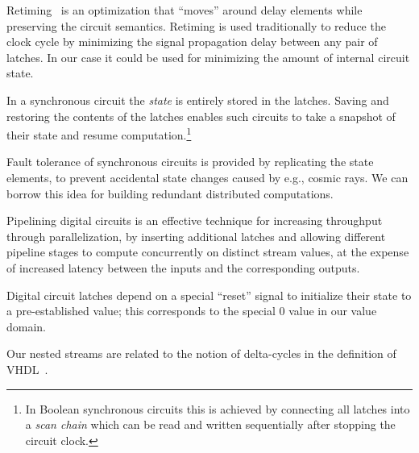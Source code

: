 Retiming~\cite{leiserson-algorithmica91} is an optimization that
``moves'' around delay elements while preserving the circuit
semantics.  Retiming is used traditionally to reduce the clock cycle
by minimizing the signal propagation delay between any pair of
latches.  In our case it could be used for minimizing the amount of
internal circuit state.

In a synchronous circuit the \emph{state} is entirely stored in the
latches.  Saving and restoring the contents of the latches enables
such circuits to take a snapshot of their state and resume
computation.\footnote{In Boolean synchronous circuits this is achieved
  by connecting all latches into a \emph{scan chain} which can be read
  and written sequentially after stopping the circuit clock.}

Fault tolerance of synchronous circuits is provided by replicating the
state elements, to prevent accidental state changes caused by e.g.,
cosmic rays.  We can borrow this idea for building redundant
distributed computations.

Pipelining digital circuits is an effective technique for increasing
throughput through parallelization, by inserting additional latches
and allowing different pipeline stages to compute concurrently on
distinct stream values, at the expense of increased latency between
the inputs and the corresponding outputs.

Digital circuit latches depend on a special ``reset'' signal to
initialize their state to a pre-established value; this corresponds to
the special 0 value in our value domain.

Our nested streams are related to the notion of delta-cycles in the
definition of VHDL~\cite{baker-date96}.
